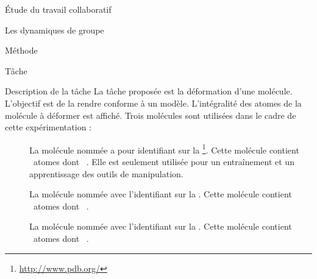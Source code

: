 \documentclass[myfrancais]{mythesis}
\begin{document}
\begin{mypart}{Étude du travail collaboratif}
\begin{mychapter}{Les dynamiques de groupe}
\begin{mysection}{Méthode}
\begin{mysubsection}{Tâche}
					\begin{mysubsubsection}{Description de la tâche}
						La tâche proposée est la déformation d'une molécule.
						L'objectif est de la rendre conforme à un modèle.
						L'intégralité des atomes de la molécule à déformer est affiché.
						Trois molécules sont utilisées dans le cadre de cette expérimentation :
						\begin{description}
							\item[\myTRPCAGE]
								La molécule nommée \myTRPCAGE {} a pour identifiant \myPDB {} sur la \myPDBbase\footnote{\url{http://www.pdb.org/}}.
								Cette molécule contient ~atomes dont ~.
								Elle est seulement utilisée pour un entraînement et un apprentissage des outils de manipulation.
							\item[\myPrion]
								La molécule nommée \myPrion {} avec l'identifiant \myPDB {} sur la \myPDBbase\footnotemark[\value{footnote}].
								Cette molécule contient ~atomes dont ~.
							\item[\myUbiquitin]
								La molécule nommée \myUbiquitin {} avec l'identifiant \myPDB {} sur la \myPDBbase\footnotemark[\value{footnote}].
								Cette molécule contient ~atomes dont ~.
						\end{description}


\end{mysubsubsection}
\end{mysubsection}
\end{mysection}
\end{mychapter}
\end{mypart}
\end{document}
